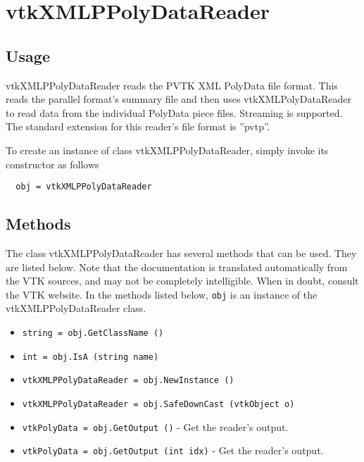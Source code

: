 \section{vtkXMLPPolyDataReader}

\subsection{Usage}

 vtkXMLPPolyDataReader reads the PVTK XML PolyData file format.
 This reads the parallel format's summary file and then uses
 vtkXMLPolyDataReader to read data from the individual PolyData
 piece files.  Streaming is supported.  The standard extension for
 this reader's file format is ''pvtp''.

To create an instance of class vtkXMLPPolyDataReader, simply
invoke its constructor as follows
\begin{verbatim}
  obj = vtkXMLPPolyDataReader
\end{verbatim}
\subsection{Methods}

The class vtkXMLPPolyDataReader has several methods that can be used.
  They are listed below.
Note that the documentation is translated automatically from the VTK sources,
and may not be completely intelligible.  When in doubt, consult the VTK website.
In the methods listed below, \verb|obj| is an instance of the vtkXMLPPolyDataReader class.
\begin{itemize}
\item  \verb|string = obj.GetClassName ()|

\item  \verb|int = obj.IsA (string name)|

\item  \verb|vtkXMLPPolyDataReader = obj.NewInstance ()|

\item  \verb|vtkXMLPPolyDataReader = obj.SafeDownCast (vtkObject o)|

\item  \verb|vtkPolyData = obj.GetOutput ()| -  Get the reader's output.

\item  \verb|vtkPolyData = obj.GetOutput (int idx)| -  Get the reader's output.

\end{itemize}

